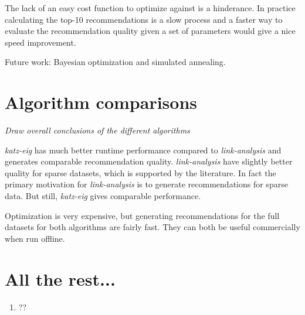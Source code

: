 The lack of an easy cost function to optimize against is a hinderance. In practice calculating the top-10 recommendations is a slow process and a faster way to evaluate the recommendation quality given a set of parameters would give a nice speed improvement.

Future work: Bayesian optimization and simulated annealing.


\section{Algorithm comparisons}

\textit{Draw overall conclusions of the different algorithms}

\textit{katz-eig} has much better runtime performance compared to \textit{link-analysis} and generates comparable recommendation quality. \textit{link-analysis} have slightly better quality for sparse datasets, which is supported by the literature. In fact the primary motivation for \textit{link-analysis} is to generate recommendations for sparse data. But still, \textit{katz-eig} gives comparable performance.

Optimization is very expensive, but generating recommendations for the full datasets for both algorithms are fairly fast. They can both be useful commercially when run offline.


\section{All the rest...}

\begin{enumerate}
    \item ??
\end{enumerate}




